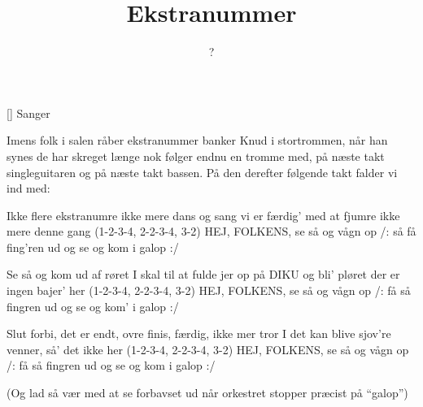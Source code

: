 \documentclass[a4paper,11pt]{article}
\title{Ekstranummer}
\author{?}
\begin{document}
\maketitle

\begin{roles}
[] Sanger
\end{roles}

Imens folk i salen råber ekstranummer banker Knud i stortrommen, når
han synes de har skreget længe nok følger endnu en tromme med, på
næste takt singleguitaren og på næste takt bassen.  På den derefter
følgende takt falder vi ind med:

\begin{song}
  Ikke flere ekstranumre
  ikke mere dans og sang
  vi er færdig' med at fjumre
  ikke mere denne gang
  (1-2-3-4, 2-2-3-4, 3-2)
  HEJ, FOLKENS, se så og vågn op
  /: så få fing'ren ud og se og kom i galop :/

  Se så og kom ud af røret
  I skal til at fulde jer
  op på DIKU og bli' pløret
  der er ingen bajer' her
  (1-2-3-4, 2-2-3-4, 3-2)
  HEJ, FOLKENS, se så og vågn op
  /: få så fingren ud og se og kom' i galop :/

  Slut forbi, det er endt, ovre
  finis, færdig, ikke mer
  tror I det kan blive sjov're
  venner, så' det ikke her
  (1-2-3-4, 2-2-3-4, 3-2)
  HEJ, FOLKENS, se så og vågn op
  /: få så fingren ud og se og kom i galop :/
\end{song}

(Og lad så vær med at se forbavset ud når orkestret stopper præcist på
"`galop"')
\end{document}
